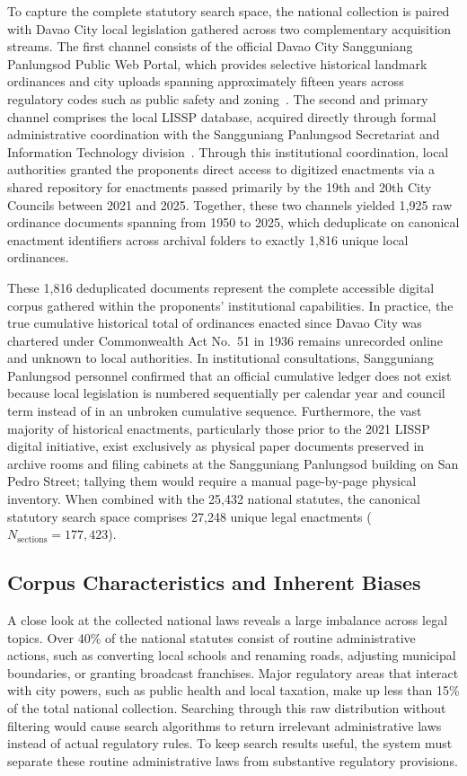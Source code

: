         To capture the complete statutory search space, the national collection is paired with Davao City local legislation gathered across two complementary acquisition streams. The first channel consists of the official Davao City Sangguniang Panlungsod Public Web Portal, which provides selective historical landmark ordinances and city uploads spanning approximately fifteen years across regulatory codes such as public safety and zoning~\cite{spdavao2026}. The second and primary channel comprises the local LISSP database, acquired directly through formal administrative coordination with the Sangguniang Panlungsod Secretariat and Information Technology division~\cite{citygov2025lissp}. Through this institutional coordination, local authorities granted the proponents direct access to digitized enactments via a shared repository for enactments passed primarily by the 19th and 20th City Councils between 2021 and 2025. Together, these two channels yielded 1,925 raw ordinance documents spanning from 1950 to 2025, which deduplicate on canonical enactment identifiers across archival folders to exactly 1,816 unique local ordinances.

        These 1,816 deduplicated documents represent the complete accessible digital corpus gathered within the proponents' institutional capabilities. In practice, the true cumulative historical total of ordinances enacted since Davao City was chartered under Commonwealth Act No.~51 in 1936 remains unrecorded online and unknown to local authorities. In institutional consultations, Sangguniang Panlungsod personnel confirmed that an official cumulative ledger does not exist because local legislation is numbered sequentially per calendar year and council term instead of in an unbroken cumulative sequence. Furthermore, the vast majority of historical enactments, particularly those prior to the 2021 LISSP digital initiative, exist exclusively as physical paper documents preserved in archive rooms and filing cabinets at the Sangguniang Panlungsod building on San Pedro Street; tallying them would require a manual page-by-page physical inventory. When combined with the 25,432 national statutes, the canonical statutory search space comprises 27,248 unique legal enactments ($N_{\text{sections}} = 177{,}423$).

        \subsection{Corpus Characteristics and Inherent Biases}
        \label{sec:corpus_biases}
        A close look at the collected national laws reveals a large imbalance across legal topics. Over 40\% of the national statutes consist of routine administrative actions, such as converting local schools and renaming roads, adjusting municipal boundaries, or granting broadcast franchises. Major regulatory areas that interact with city powers, such as public health and local taxation, make up less than 15\% of the total national collection. Searching through this raw distribution without filtering would cause search algorithms to return irrelevant administrative laws instead of actual regulatory rules. To keep search results useful, the system must separate these routine administrative laws from substantive regulatory provisions.

